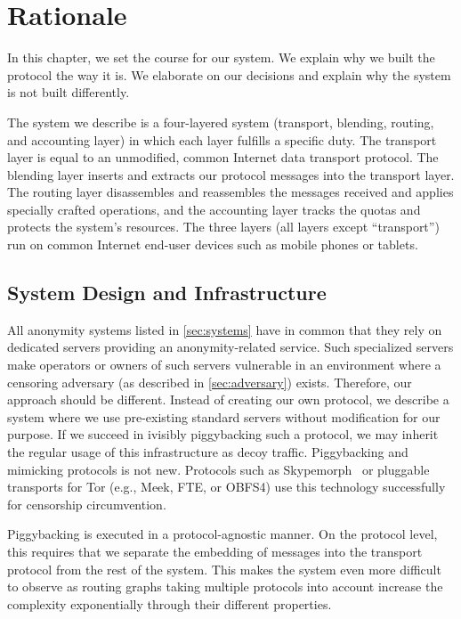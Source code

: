 \chapter{Rationale}\label{sec:rationale}
In this chapter, we set the course for our system. We explain why we built the protocol the way it is. We elaborate on our decisions and explain why the system is not built differently.

The system we describe is a four-layered system (transport, blending, routing, and accounting layer) in which each layer fulfills a specific duty. The transport layer is equal to an unmodified, common Internet data transport protocol. The blending layer inserts and extracts our protocol messages into the transport layer. The routing layer disassembles and reassembles the messages received and applies specially crafted operations, and the accounting layer tracks the  quotas and protects the system's resources. The three \MessageVortex{} layers (all layers except ``transport'') run on common Internet end-user devices such as mobile phones or tablets.

\section{System Design and Infrastructure}
All anonymity systems listed in \cref{sec:systems} have in common that they rely on dedicated servers providing an anonymity-related service. Such specialized servers make operators or owners of such servers vulnerable in an environment where a censoring adversary (as described in \cref{sec:adversary}) exists. Therefore, our approach should be different. Instead of creating our own protocol, we describe a system where we use pre-existing standard servers without modification for our purpose. If we succeed in ivisibly piggybacking such a protocol, we may inherit the regular usage of this infrastructure as decoy traffic. Piggybacking and mimicking protocols is not new. Protocols such as Skypemorph~\cite{mohajeri2012skypemorph} or pluggable transports for Tor (e.g., Meek, FTE, or OBFS4) use this technology successfully for censorship circumvention.

Piggybacking is executed in a protocol-agnostic manner. On the protocol level, this requires that we separate the embedding of messages into the transport protocol from the rest of the system. This makes the system even more difficult to observe as routing graphs taking multiple protocols into account increase the complexity exponentially through their different properties.

